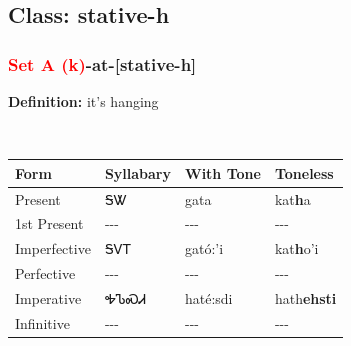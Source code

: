 \subsection*{Class: stative-h}
\nopagebreak
\needspace{2in}
\subsubsection*{\textcolor{Red}{Set A (k)}{-}\textbf{at}{-}[stative-h]}
\nopagebreak
\textbf{Definition: } it{\textquoteright}s hanging
\\[0.5em]
\begin{tabularx}{\textwidth}{l X X X}%
\toprule%
\textbf{Form}&\textbf{Syllabary}&\textbf{With Tone}&\textbf{Toneless}\\%
\midrule%
Present&ᎦᏔ&gata&kat\textbf{h}a\\%
1st Present&{-}{-}{-}&{-}{-}{-}&{-}{-}{-}\\%
Imperfective&ᎦᏙᎢ&gató:’i&kat\textbf{h}o'i\\%
Perfective&{-}{-}{-}&{-}{-}{-}&{-}{-}{-}\\%
Imperative&ᎭᏖᏍᏗ&haté:sdi&hath\textbf{ehsti}\\%
Infinitive&{-}{-}{-}&{-}{-}{-}&{-}{-}{-}\\%
\bottomrule%
\end{tabularx}
\\[1em]